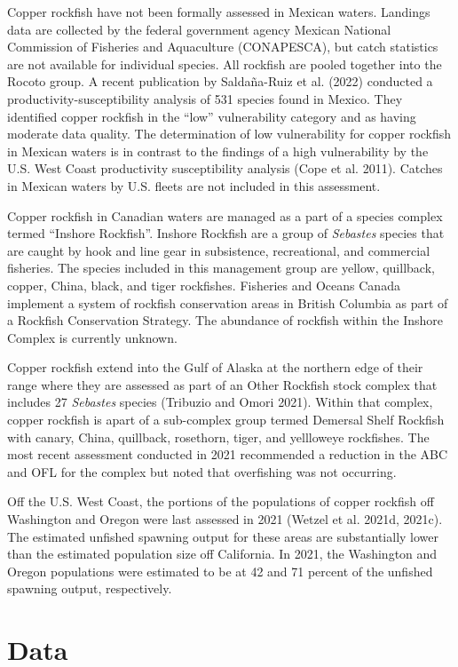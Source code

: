 \documentclass[11pt,
  english,
  letterpaper,
]{article}
\begin{document}
Copper rockfish have not been formally assessed in Mexican waters. Landings data are collected by the federal government agency Mexican National Commission of Fisheries and Aquaculture (CONAPESCA), but catch statistics are not available for individual species. All rockfish are pooled together into the Rocoto group. A recent publication by Saldaña-Ruiz et al. (2022) conducted a productivity-susceptibility analysis of 531 species found in Mexico. They identified copper rockfish in the ``low'' vulnerability category and as having moderate data quality. The determination of low vulnerability for copper rockfish in Mexican waters is in contrast to the findings of a high vulnerability by the U.S. West Coast productivity susceptibility analysis (Cope et al. 2011). Catches in Mexican waters by U.S. fleets are not included in this assessment.

Copper rockfish in Canadian waters are managed as a part of a species complex termed ``Inshore Rockfish''. Inshore Rockfish are a group of \emph{Sebastes} species that are caught by hook and line gear in subsistence, recreational, and commercial fisheries. The species included in this management group are yellow, quillback, copper, China, black, and tiger rockfishes. Fisheries and Oceans Canada implement a system of rockfish conservation areas in British Columbia as part of a Rockfish Conservation Strategy. The abundance of rockfish within the Inshore Complex is currently unknown.

Copper rockfish extend into the Gulf of Alaska at the northern edge of their range where they are assessed as part of an Other Rockfish stock complex that includes 27 \emph{Sebastes} species (Tribuzio and Omori 2021). Within that complex, copper rockfish is apart of a sub-complex group termed Demersal Shelf Rockfish with canary, China, quillback, rosethorn, tiger, and yellloweye rockfishes. The most recent assessment conducted in 2021 recommended a reduction in the ABC and OFL for the complex but noted that overfishing was not occurring.

Off the U.S. West Coast, the portions of the populations of copper rockfish off Washington and Oregon were last assessed in 2021 (Wetzel et al. 2021d, 2021c). The estimated unfished spawning output for these areas are substantially lower than the estimated population size off California. In 2021, the Washington and Oregon populations were estimated to be at 42 and 71 percent of the unfished spawning output, respectively.

\hypertarget{data}{%
\section{Data}\label{data}}
\end{document}
